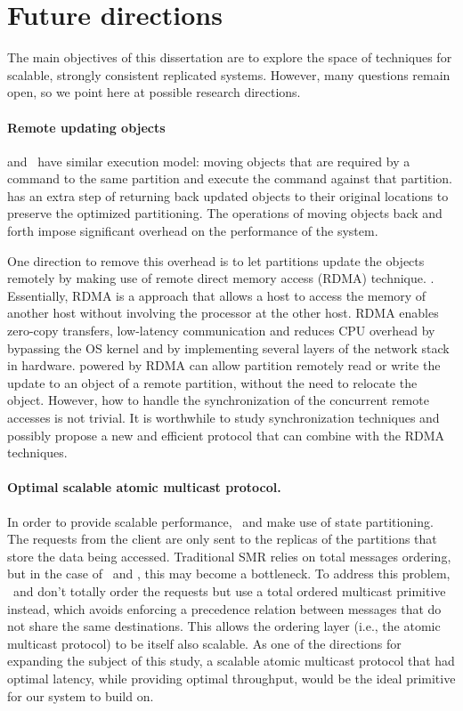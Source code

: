 \section{Future directions}

The main objectives of this dissertation are to explore the space of techniques
for scalable, strongly consistent replicated systems. However, many questions
remain open, so we point here at possible research directions.

\paragraph{Remote updating objects} \dynastar and \dssmr\ have similar execution
model: moving objects that are required by a command to the same partition and
execute the command against that partition. \dynastar has an extra step of
returning back updated objects to their original locations to preserve the
optimized partitioning. The operations of moving objects back and forth impose
significant overhead on the performance of the system. 

One direction to remove this overhead is to let partitions update the objects
remotely by making use of remote direct memory access (RDMA) technique.
\cite{recio2007remote,dragojevic2014farm}. Essentially, RDMA is a approach
that allows a host to access the memory of another host without involving the
processor at the other host. RDMA enables zero-copy transfers, low-latency
communication and reduces CPU overhead by bypassing the OS kernel and by
implementing several layers of the network stack in hardware. \dynastar powered
by RDMA can allow partition remotely read or write the update to an object
of a remote partition, without the need to relocate the object. However, how
to handle the synchronization of the concurrent remote accesses is not trivial.
It is worthwhile to study synchronization techniques and possibly propose a new
and efficient protocol that can combine \dynastar with the RDMA techniques.

\paragraph{Optimal scalable atomic multicast protocol.} 
In order to provide scalable performance, \dssmr\ and \dynastar make use of
state partitioning. The requests from the client are only sent to the replicas
of the partitions that store the data being accessed. Traditional SMR relies on
total messages ordering, but in the case of \dssmr\ and \dynastar, this may
become a bottleneck. To address this problem, \dssmr\ and \dynastar don't
totally order the requests but use a total ordered multicast primitive instead,
which avoids enforcing a precedence relation between messages that do not share
the same destinations. This allows the ordering layer (i.e., the atomic
multicast protocol) to be itself also scalable.  As one of the directions for
expanding the subject of this study, a scalable atomic multicast protocol that
had optimal latency, while providing optimal throughput, would be the ideal
primitive for our system to build on.


